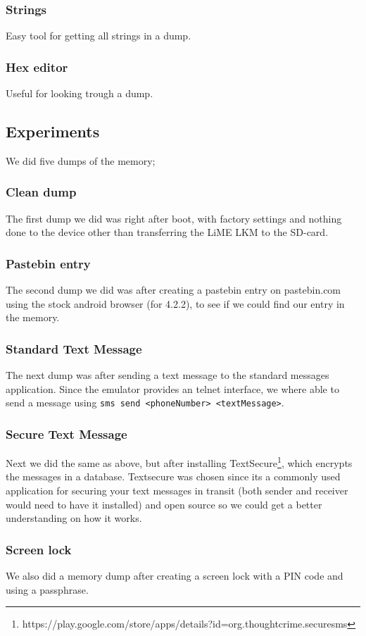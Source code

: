   \subsubsection{Strings}
  Easy tool for getting all strings in a dump.
  \subsubsection{Hex editor}
  Useful for looking trough a dump.
\subsection{Experiments}
We did five dumps of the memory;
  \subsubsection{Clean dump}
  The first dump we did was right after boot, with factory settings and nothing done to the device 
  other than transferring the LiME LKM to the SD-card.
  \subsubsection{Pastebin entry}
  The second dump we did was after creating a pastebin entry on pastebin.com using the stock android browser (for 4.2.2),
  to see if we could find our entry in the memory.
  \subsubsection{Standard Text Message}
  The next dump was after sending a text message to the standard messages application. Since the emulator provides an telnet 
  interface, we where able to send a message using \texttt{sms send <phoneNumber> <textMessage>}.
  \subsubsection{Secure Text Message}
  Next we did the same as above, but after installing 
  TextSecure\footnote{https://play.google.com/store/apps/details?id=org.thoughtcrime.securesms}, which encrypts the messages in a database. Textsecure was chosen since its a commonly used application for securing your text messages in transit (both sender and receiver would need to have it installed) and open source so we could get a better understanding on how it works. 
  \subsubsection{Screen lock}
  We also did a memory dump after creating a screen lock with a PIN code and using a passphrase.
